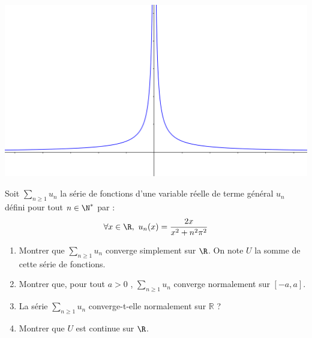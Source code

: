 \documentclass[a4paper,twoside,french,11pt]{VcCours}
\newcommand{\Sum}[2]{\sum_{#1}^{#2}}
\begin{document}
\begin{enumerate}
\begin{center}
\includegraphics[scale=0.4]{TD6-corr-allure}
\end{center}
\end{enumerate}

\medskip


\begin{Exercice}{}  Soit $\Sum{n \geq 1}{} u_n$ la série de fonctions d'une variable réelle de terme général $u_n$ défini pour tout $n \in \N^*$ par : 
$$ \forall x \in \R ,\ u_n(x)=\dfrac{2x}{x^2+n^2\pi^2}$$
\begin{enumerate}
\item Montrer que $\Sum{n \geq 1}{} u_n$ converge simplement sur $\R$. On note $U$ la somme de cette  série de fonctions.
\item Montrer que, pour tout $a > 0$ , $\Sum{n \geq 1}{} u_n$ converge normalement sur $[-a,a]$.
\item La série $\Sum{n \geq 1}{} u_n$ converge-t-elle normalement sur $\mathbb{R}$ ?
\item Montrer que $U$ est continue sur $\R$.
\end{enumerate}
\end{Exercice}
\end{document}
